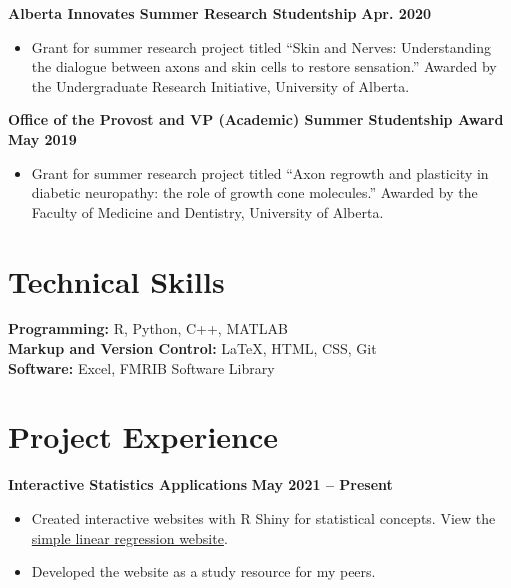 \documentclass{article}
\begin{document}
\textbf{Alberta Innovates Summer Research Studentship} \hfill \textbf{Apr. 2020}
\begin{itemize}
    \item Grant for summer research project titled ``Skin and Nerves: Understanding the dialogue between axons and skin cells to restore sensation.'' Awarded by the Undergraduate Research Initiative, University of Alberta.
\end{itemize}
\textbf{Office of the Provost and VP (Academic) Summer Studentship Award} \hfill \textbf{May 2019}
    \begin{itemize}
        \item Grant for summer research project titled ``Axon regrowth and plasticity in diabetic neuropathy: the role of growth cone molecules.'' Awarded by the Faculty of Medicine and Dentistry, University of Alberta.
    \end{itemize}


\section*{\textcolor{my_colour}{Technical Skills}}
\vspace{-.25em} \hrulefill \vspace{.75em}

\textbf{Programming:} R, Python, C++, MATLAB \\
\textbf{Markup and Version Control:} \LaTeX, HTML, CSS, Git \\
\textbf{Software:} Excel, FMRIB Software Library


\section*{\textcolor{my_colour}{Project Experience}}
\vspace{-.25em} \hrulefill \vspace{.75em}

\textbf{Interactive Statistics Applications} \hfill \textbf{May 2021 -- Present}
\begin{itemize}
    \item Created interactive websites with R Shiny for statistical concepts. View the \href{https://intro-stats.shinyapps.io/slreg/}{simple linear regression website}.
    \item Developed the website as a study resource for my peers.
\end{itemize}
\end{document}
